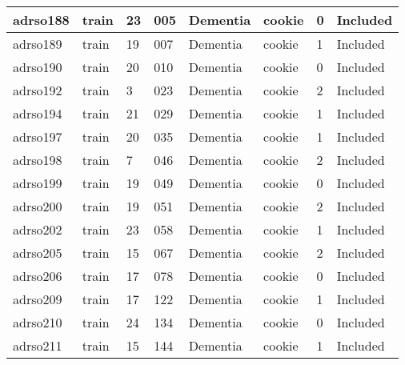 \begin{center}
\begin{longtable}{|l|l|l|l|l|l|l|l|}
adrso188  & train            & 23           & 005         & Dementia             & cookie          & 0                & Included      \\ \hline
adrso189  & train            & 19           & 007         & Dementia             & cookie          & 1                & Included      \\ \hline
adrso190  & train            & 20           & 010         & Dementia             & cookie          & 0                & Included      \\ \hline
adrso192  & train            & 3            & 023         & Dementia             & cookie          & 2                & Included      \\ \hline
adrso194  & train            & 21           & 029         & Dementia             & cookie          & 1                & Included      \\ \hline
adrso197  & train            & 20           & 035         & Dementia             & cookie          & 1                & Included      \\ \hline
adrso198  & train            & 7            & 046         & Dementia             & cookie          & 2                & Included      \\ \hline
adrso199  & train            & 19           & 049         & Dementia             & cookie          & 0                & Included      \\ \hline
adrso200  & train            & 19           & 051         & Dementia             & cookie          & 2                & Included      \\ \hline
adrso202  & train            & 23           & 058         & Dementia             & cookie          & 1                & Included      \\ \hline
adrso205  & train            & 15           & 067         & Dementia             & cookie          & 2                & Included      \\ \hline
adrso206  & train            & 17           & 078         & Dementia             & cookie          & 0                & Included      \\ \hline
adrso209  & train            & 17           & 122         & Dementia             & cookie          & 1                & Included      \\ \hline
adrso210  & train            & 24           & 134         & Dementia             & cookie          & 0                & Included      \\ \hline
adrso211  & train            & 15           & 144         & Dementia             & cookie          & 1                & Included      \\ \hline

\end{longtable}
\end{center}
